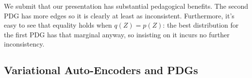 \documentclass[twoside]{article}
\makeatletter
\theoremstyle{plain}
\theoremstyle{definition}
\let\H\relax
\DeclareMathOperator{\H}{\mathrm{H}} %
\DeclareMathOperator*{\Ex}{\mathbb{E}} %
\newcommand{\datadist}[1]{\Pr\nolimits_{#1}}
\newcommand\Inc{\mathit{Inc}}
\newcommand\aar{\@ifstar\aar@one@star\aar@plain}
\newcommand\aar@one@star{\@ifstar\aar@resize{\aar@plain*}}
\newcommand\aar@resize[1]{\sbox{\aar@content}{#1}\scaleleftright[3.8ex]
		{\Biggl\langle\!\!\!\!\Biggl\langle}{\usebox{\aar@content}}
		{\Biggr\rangle\!\!\!\!\Biggr\rangle}}
\makeatother
\begin{document}
We submit that our presentation has substantial pedagogical benefits. The second PDG has more edges so it is clearly at least as inconsistent. Furthermore, it's easy to see that equality holds when $q(Z) = p(Z)$: the best distribution for the first PDG has that marginal anyway, so insisting on it incurs no further inconsistency.




\subsection{Variational Auto-Encoders and PDGs}
\end{document}
